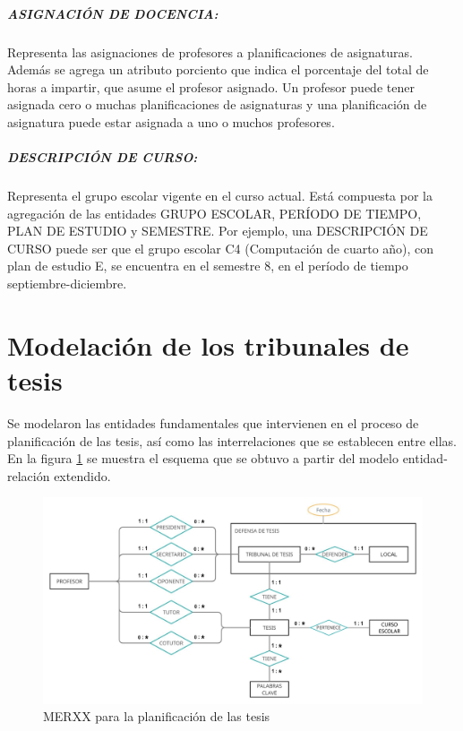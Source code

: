 


\subparagraph{ASIGNACIÓN DE DOCENCIA:}
Representa las asignaciones de profesores a planificaciones de asignaturas.
Además se agrega un atributo porciento que indica el porcentaje del total de horas 
a impartir, que asume el profesor asignado. Un profesor puede 
tener asignada cero o muchas planificaciones de asignaturas y una planificación de 
asignatura puede estar asignada a uno o muchos profesores.


\subparagraph{DESCRIPCIÓN DE CURSO:}
Representa el grupo escolar vigente en el curso actual. Está 
compuesta por la agregación de las entidades GRUPO ESCOLAR,
PERÍODO DE TIEMPO, PLAN DE ESTUDIO y SEMESTRE.  
Por ejemplo, una DESCRIPCIÓN DE CURSO puede ser 
que el grupo escolar C4 (Computación de cuarto año), con plan de
estudio E, se encuentra en el semestre 8,  en el período de tiempo septiembre-diciembre.






\section{Modelación de los tribunales de tesis}\label{database:planificación-tesis}
Se modelaron las entidades fundamentales 
que intervienen en el proceso de planificación de las tesis, así como 
las interrelaciones que se establecen entre ellas. En la figura 
\ref{merxx-thesis} se muestra el esquema que se obtuvo a partir del 
modelo entidad-relación extendido.


\begin{figure}[H]
    \includegraphics[scale=0.31]{Graphics/Database/MERXX-TC-FINAL.png}
    \caption{MERXX para la planificación de las tesis}
    \label{merxx-thesis}
\end{figure}


